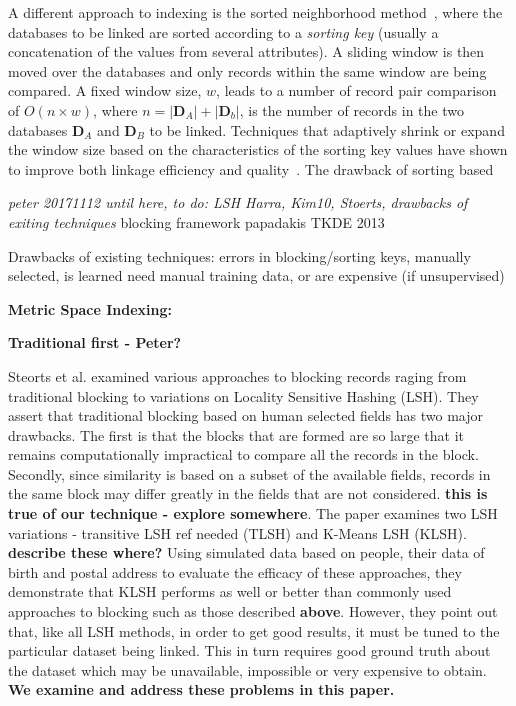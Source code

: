 \documentclass{llncs}
\begin{document}
A different approach to indexing is the sorted neighborhood 
method~\cite{Mon96}, where the databases to be linked are sorted
according to a \emph{sorting key} (usually a concatenation of the
values from several attributes). A sliding window is then moved over
the databases and only records within the same window are being
compared. A fixed window size, $w$, leads to a number of record
pair comparison of $O(n \times w)$, where $n = |\mathbf{D}_A| +
|\mathbf{D}_b|$, is the number of records in the two databases
$\mathbf{D}_A$ and $\mathbf{D}_B$ to be linked. Techniques that
adaptively shrink or expand the window size based on the
characteristics of the sorting key values have shown to improve both
linkage efficiency and quality~\cite{Dra12}. The drawback of sorting
based

\emph{peter 20171112 until here, to do: LSH Harra, Kim10, Stoerts, drawbacks of exiting techniques}
blocking framework papadakis TKDE 2013



Drawbacks of existing techniques: errors in blocking/sorting keys,
manually selected, is learned need manual training data, or are
expensive (if unsupervised)


\smallskip
\textbf{Metric Space Indexing:}



\textbf{Traditional first - Peter?}

Steorts et al. \cite{Steorts2014} examined various approaches to blocking records raging from traditional blocking to variations on Locality Sensitive Hashing (LSH). They assert that traditional blocking based on human selected fields has two major drawbacks. The first is that the blocks that are formed are so large that it remains computationally impractical to compare all the records in the block. Secondly, since similarity is based on a subset of the available fields, records in the same block may differ greatly in the fields that are not considered. \textbf{{this is true of our technique - explore somewhere}}. The paper examines two LSH variations - transitive LSH {ref needed} (TLSH) and K-Means LSH (KLSH). {\textbf{describe these where?}} 
Using simulated data based on people, their data of birth and postal address to evaluate the efficacy of these approaches, they demonstrate that KLSH performs as well or better than commonly used approaches to blocking such as those described \textbf{above}. However, they point out that, like all LSH methods, in order to get good results, it must be tuned to the particular dataset being linked. This in turn requires good ground truth about the dataset which may be unavailable, impossible or very expensive to obtain. \textbf{We examine and address these problems in this paper.}
\end{document}
